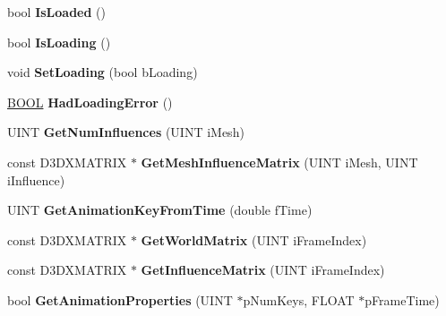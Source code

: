 \begin{DoxyCompactItemize}
\item 
\hypertarget{class_c_d_x_u_t_s_d_k_mesh_a8833fa412e4a6b3155a34421fc395b25}{bool {\bfseries Is\+Loaded} ()}\label{class_c_d_x_u_t_s_d_k_mesh_a8833fa412e4a6b3155a34421fc395b25}

\item 
\hypertarget{class_c_d_x_u_t_s_d_k_mesh_a64b16ca374a81b59c6dc59486ace4640}{bool {\bfseries Is\+Loading} ()}\label{class_c_d_x_u_t_s_d_k_mesh_a64b16ca374a81b59c6dc59486ace4640}

\item 
\hypertarget{class_c_d_x_u_t_s_d_k_mesh_acc9548373610fd1fc5c105d8cff23df7}{void {\bfseries Set\+Loading} (bool b\+Loading)}\label{class_c_d_x_u_t_s_d_k_mesh_acc9548373610fd1fc5c105d8cff23df7}

\item 
\hypertarget{class_c_d_x_u_t_s_d_k_mesh_a883ceaeb4d4b8513478700bb924fa0c6}{\hyperlink{_ice_types_8h_a050c65e107f0c828f856a231f4b4e788}{B\+O\+O\+L} {\bfseries Had\+Loading\+Error} ()}\label{class_c_d_x_u_t_s_d_k_mesh_a883ceaeb4d4b8513478700bb924fa0c6}

\item 
\hypertarget{class_c_d_x_u_t_s_d_k_mesh_a37c96c5a95d24174c5229854964acb7d}{U\+I\+N\+T {\bfseries Get\+Num\+Influences} (U\+I\+N\+T i\+Mesh)}\label{class_c_d_x_u_t_s_d_k_mesh_a37c96c5a95d24174c5229854964acb7d}

\item 
\hypertarget{class_c_d_x_u_t_s_d_k_mesh_a2ba2cb286acd296ab8e731374431211a}{const D3\+D\+X\+M\+A\+T\+R\+I\+X $\ast$ {\bfseries Get\+Mesh\+Influence\+Matrix} (U\+I\+N\+T i\+Mesh, U\+I\+N\+T i\+Influence)}\label{class_c_d_x_u_t_s_d_k_mesh_a2ba2cb286acd296ab8e731374431211a}

\item 
\hypertarget{class_c_d_x_u_t_s_d_k_mesh_af79a935bbfdecc1bda4549238dd39675}{U\+I\+N\+T {\bfseries Get\+Animation\+Key\+From\+Time} (double f\+Time)}\label{class_c_d_x_u_t_s_d_k_mesh_af79a935bbfdecc1bda4549238dd39675}

\item 
\hypertarget{class_c_d_x_u_t_s_d_k_mesh_afbc2441205f4d1ee0bf3d53d09f7a416}{const D3\+D\+X\+M\+A\+T\+R\+I\+X $\ast$ {\bfseries Get\+World\+Matrix} (U\+I\+N\+T i\+Frame\+Index)}\label{class_c_d_x_u_t_s_d_k_mesh_afbc2441205f4d1ee0bf3d53d09f7a416}

\item 
\hypertarget{class_c_d_x_u_t_s_d_k_mesh_a554e4f25e42ae52af2652d2fa002b950}{const D3\+D\+X\+M\+A\+T\+R\+I\+X $\ast$ {\bfseries Get\+Influence\+Matrix} (U\+I\+N\+T i\+Frame\+Index)}\label{class_c_d_x_u_t_s_d_k_mesh_a554e4f25e42ae52af2652d2fa002b950}

\item 
\hypertarget{class_c_d_x_u_t_s_d_k_mesh_afa5ea207a0f13de55cdb27a04290de4a}{bool {\bfseries Get\+Animation\+Properties} (U\+I\+N\+T $\ast$p\+Num\+Keys, F\+L\+O\+A\+T $\ast$p\+Frame\+Time)}\label{class_c_d_x_u_t_s_d_k_mesh_afa5ea207a0f13de55cdb27a04290de4a}

\end{DoxyCompactItemize}
